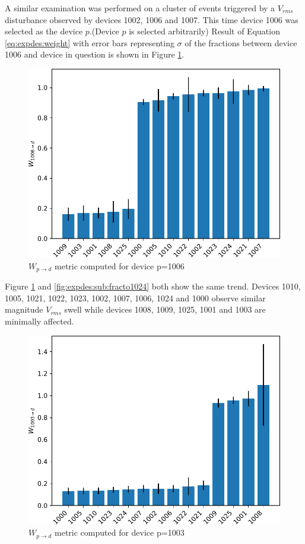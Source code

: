 A similar examination was performed on a cluster of events triggered by a $V_{rms}$ disturbance observed by devices 1002, 1006 and 1007.
This time device 1006 was selected as the device $p$.(Device $p$ is selected arbitrarily)
Result of Equation \ref{eq:expdes:weight} with error bars representing  $\sigma$ of the fractions between device 1006 and device in question is shown in Figure \ref{fig:expdes:sub:fracto1006}.

\begin{figure}[ht!]
    \centering
    \includegraphics[width=0.8\linewidth]{img/napali_eval/subthreshold/clustering/1006toall.pdf}
    \caption{$W_{p \rightarrow d}$ metric computed for device p=1006}
    \label{fig:expdes:sub:fracto1006}
\end{figure}

Figure \ref{fig:expdes:sub:fracto1006} and \ref{fig:expdes:sub:fracto1024} both show the same trend.
Devices 1010, 1005, 1021, 1022, 1023, 1002, 1007, 1006, 1024 and 1000 observe similar magnitude $V_{rms}$ swell while devices 1008, 1009, 1025, 1001 and 1003 are minimally affected.

\begin{figure}[ht!]
    \centering
    \includegraphics[width=0.8\linewidth]{img/napali_eval/subthreshold/clustering/1003toall.pdf}
    \caption{$W_{p \rightarrow d}$ metric computed for device p=1003}
    \label{fig:expdes:sub:fracto1003}
\end{figure}

